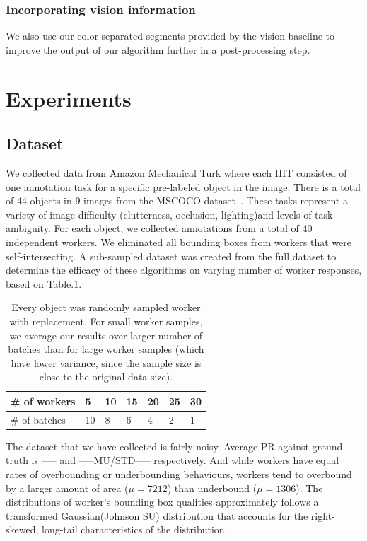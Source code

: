 \documentclass[letterpaper]{article} %
\begin{document}
\subsubsection{Incorporating vision information}
We also use our color-separated segments provided by the vision baseline to improve the output of our algorithm further in a post-processing step.

\section{Experiments}
\subsection{Dataset}
We collected data from Amazon Mechanical Turk where each HIT consisted of one annotation task for a specific pre-labeled object in the image. There is a total of 44 objects in 9 images from the MSCOCO dataset~\cite{Lin2014}. These tasks represent a variety of image difficulty (clutterness, occlusion, lighting)and levels of task ambiguity. For each object, we collected annotations from a total of 40 independent workers. We eliminated all bounding boxes from workers that were self-intersecting. A sub-sampled dataset was created from the full dataset to determine the efficacy of these algorithms on varying number of worker responses, based on Table.\ref{batch_sample}.
\begin{table}[ht]
\centering
\label{batch_sample}
\caption{Every object was randomly sampled worker with replacement. For small worker samples, we average our results over larger number of batches than for large worker samples (which have lower variance, since the sample size is close to the original data size).}
\begin{tabular}{l|llllll}
\# of workers & 5  & 10 & 15 & 20 & 25 & 30 \\ \hline
\# of batches & 10 & 8  & 6  & 4  & 2  & 1 
\end{tabular}
\end{table}
\par The dataset that we have collected is fairly noisy. Average PR against ground truth is ----- and -----MU/STD----- respectively. And while workers have equal rates of overbounding or underbounding behaviours, workers tend to overbound by a larger amount of area ($\mu=7212$) than underbound ($\mu=1306$).  The distributions of worker's bounding box qualities approximately follows a transformed Gaussian(Johnson SU) distribution that accounts for the right-skewed, long-tail characteristics of the distribution.
\end{document}
